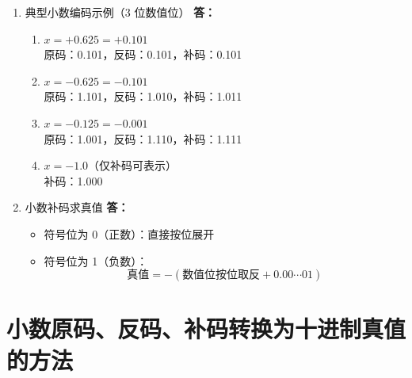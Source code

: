 \documentclass{article}
\begin{document}
\begin{enumerate}[label=\textbf{\arabic*}.]
    \item 典型小数编码示例（3 位数值位）
    \textbf{答：}
    \begin{enumerate}[label=(\arabic*)]
        \item $x = +0.625 = +0.101$
        \\原码：0.101，反码：0.101，补码：0.101
        \item $x = -0.625 = -0.101$
        \\原码：1.101，反码：1.010，补码：1.011
        \item $x = -0.125 = -0.001$
        \\原码：1.001，反码：1.110，补码：1.111
        \item $x = -1.0$（仅补码可表示）
        \\补码：1.000
    \end{enumerate}

    \item 小数补码求真值
    \textbf{答：}
    \begin{itemize}
        \item 符号位为 0（正数）：直接按位展开
        \item 符号位为 1（负数）：
        \[\text{真值} = -(\text{数值位按位取反} + 0.00\cdots01)\]
    \end{itemize}

\end{enumerate}

\section{小数原码、反码、补码转换为十进制真值的方法}
\end{document}
